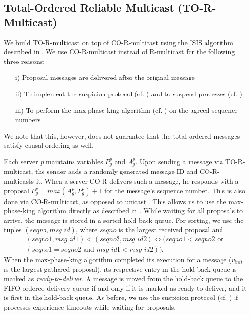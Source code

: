 \documentclass[runningheads]{llncs}
\begin{document}
\subsection{Total-Ordered Reliable Multicast (TO-R-Multicast)} \label{sec:to_multicast}
We build TO-R-multicast on top of CO-R-multicast using the ISIS algorithm described in \cite[p.~655-656]{ds_book}. We use CO-R-multicast instead of R-multicast for the following three reasons:
\begin{enumerate}
    \item[i)] Proposal messages are delivered after the original message
    \item[ii)] To implement the suspicion protocol (cf. ) and to suspend processes (cf. )
    \item[iii)] To perform the max-phase-king algorithm (cf. ) on the agreed sequence numbers   
\end{enumerate}
We note that this, however, does not guarantee that the total-ordered messages satisfy causal-ordering as well.

Each server $p$ maintains variables $P_g^p$ and $A_g^p$. Upon sending a message via TO-R-multicast, the sender adds a randomly generated message ID and CO-R-multicasts it. When a server CO-R-delivers such a message, he responds with a proposal $P_g^p = max(A_g^p, P_g^p)+1$ for the message's sequence number. This is also done via CO-R-multicast, as opposed to unicast \cite[p.~655-656]{ds_book}. This allows us to use the max-phase-king algorithm directly as described in . While waiting for all proposals to arrive, the message is stored in a sorted hold-back queue. For sorting, we use the tuples $(seqno, msg\_id)$, where $seqno$ is the largest received proposal and
\begin{align*}
    (seqno1, msg\_id1) < (seqno2, msg\_id2) \iff (seqno1 < seqno2 \text{ or } \\
    (seqno1 = seqno2 \text{ and } msg\_id1 < msg\_id2)).
\end{align*}
When the max-phase-king algorithm completed its execution for a message ($v_{init}$ is the largest gathered proposal), its respective entry in the hold-back queue is marked as \textit{ready-to-deliver}. A message is moved from the hold-back queue to the FIFO-ordered delivery queue if and only if it is marked as ready-to-deliver, and it is first in the hold-back queue. As before, we use the suspicion protocol (cf. ) if processes experience timeouts while waiting for proposals.
\end{document}
